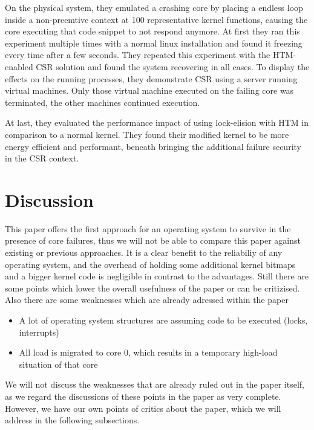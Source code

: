 \documentclass[a4paper,10pt,twoside]{article}
\begin{document}
On the physical system, they emulated a crashing core by placing a endless loop inside a non-preemtive context at 100 representative kernel functions, causing the core executing that code snippet to not respond anymore. At first they ran this experiment multiple times with a normal linux installation and found it freezing every time after a few seconds. They repeated this experiment with the HTM-enabled CSR solution and found the system recovering in all cases. To display the effects on the running processes, they demonstrate CSR using a server running virtual machines. Only those virtual machine executed on the failing core was terminated, the other machines continued execution.

At last, they evaluated the performance impact of using lock-elision with HTM in comparison to a normal kernel. They found their modified kernel to be more energy efficient and performant, beneath bringing the additional failure security in the CSR context.

\section{Discussion}

This paper offers the first approach for an operating system to survive in the presence of core failures, thus we will not be able to compare this paper against existing or previous approaches. It is a clear benefit to the reliabiliy of any operating system, and the overhead of holding some additional kernel bitmaps and a bigger kernel code is negligible in contrast to the advantages.
Still there are some points which lower the overall usefulness of the paper or can be critizised. Also there are some weaknesses which are already adressed within the paper
\begin{itemize}
	\item A lot of operating system structures are assuming code to be executed (locks, interrupts)
	\item All load is migrated to core 0, which results in a temporary high-load situation of that core
\end{itemize}

We will not discuss the weaknesses that are already ruled out in the paper itself, as we regard the discussions of these points in the paper as very complete. However, we have our own points of critics about the paper, which we will address in the following subsections.
\end{document}
